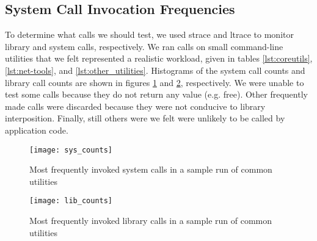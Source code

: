 \subsection{System Call Invocation Frequencies}
To determine what calls we should test, we used strace and ltrace to monitor library and system calls, respectively. We ran calls on small command-line utilities that we felt represented a realistic workload, given in tables \ref{lst:coreutils}, \ref{lst:net-tools}, and \ref{lst:other_utilities}. Histograms of the system call counts and library call counts are shown in figures \ref{fig:sys_counts} and \ref{fig:lib_counts}, respectively. We were unable to test some calls because they do not return any value (e.g. free). Other frequently made calls were discarded because they were not conducive to library interposition. Finally, still others were we felt were unlikely to be called by application code. \\
\begin{figure}
\centering
\texttt{[image: sys\_counts]}
\caption{Most frequently invoked system calls in a sample run of common utilities}
\label{fig:sys_counts}
\end{figure}

\begin{figure}
\centering
\texttt{[image: lib\_counts]}
\caption{Most frequently invoked library calls in a sample run of common utilities}
\label{fig:lib_counts}
\end{figure}
